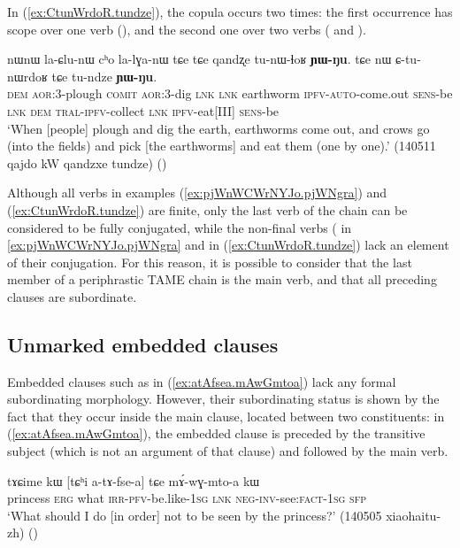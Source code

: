 In (\ref{ex:CtunWrdoR.tundze}), the copula  occurs two times: the first occurrence has scope over one verb (), and the second one over two verbs ( and ).

\begin{exe}
\ex \label{ex:CtunWrdoR.tundze}
\gll  nɯnɯ la-ɕlu-nɯ cʰo la-lɣa-nɯ tɕe tɕe qandʐe tu-nɯ-ɬoʁ \textbf{ɲɯ-ŋu}. tɕe nɯ ɕ-tu-nɯrdoʁ tɕe tu-ndze \textbf{ɲɯ-ŋu}. \\
\textsc{dem} \textsc{aor}:3\flobv{}-plough \textsc{comit}  \textsc{aor}:3\flobv{}-dig \textsc{lnk} \textsc{lnk} earthworm \textsc{ipfv}-\textsc{auto}-come.out \textsc{sens}-be \textsc{lnk} \textsc{dem} \textsc{tral}-\textsc{ipfv}-collect \textsc{lnk} \textsc{ipfv}-eat[III] \textsc{sens}-be \\
\glt `When [people] plough and dig the earth, earthworms come out, and crows go (into the fields) and pick [the earthworms] and eat them (one by one).' (140511 qajdo kW qandzxe tundze)
()
\end{exe}   

Although all verbs in examples (\ref{ex:pjWnWCWrNYJo.pjWNgra}) and (\ref{ex:CtunWrdoR.tundze}) are finite, only the last verb of the chain can be considered to be fully conjugated, while the non-final verbs ( in \ref{ex:pjWnWCWrNYJo.pjWNgra} and  in (\ref{ex:CtunWrdoR.tundze}) lack an element of their conjugation. For this reason, it is possible to consider that the last member of a periphrastic TAME chain is the main verb, and that all preceding clauses are subordinate.

\subsection{Unmarked embedded clauses} \label{sec:embedded.clause}
Embedded clauses such as   in  (\ref{ex:atAfsea.mAwGmtoa}) lack any formal subordinating morphology. However, their subordinating status is shown by the fact that they occur inside the main clause, located between two constituents: in (\ref{ex:atAfsea.mAwGmtoa}), the embedded clause is preceded by the transitive subject  (which is not an argument of that clause) and followed by the main verb.


\begin{exe}
\ex \label{ex:atAfsea.mAwGmtoa}
\gll tɤɕime kɯ [tɕʰi a-tɤ-fse-a] tɕe mɤ́-wɣ-mto-a kɯ \\
princess \textsc{erg} what \textsc{irr}-\textsc{pfv}-be.like-\textsc{1sg} \textsc{lnk} \textsc{neg}-\textsc{inv}-see:\textsc{fact}-\textsc{1sg} \textsc{sfp} \\
\glt `What should I do [in order] not to be seen by the princess?' (140505 xiaohaitu-zh)
()
\end{exe}   


